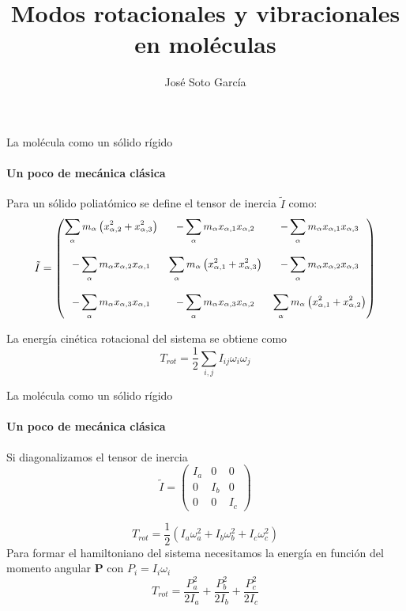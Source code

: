 \documentclass[a4paper]{beamer}
\title{Modos rotacionales y vibracionales en moléculas}
\author{José Soto García}
\begin{document}
\maketitle

\begin{frame}{La molécula como un sólido rígido}
\framesubtitle{Un poco de mecánica clásica}
  Para un sólido poliatómico se define el tensor de inercia $\tilde I$ como:
  \[\small{
\tilde{I}=\begin{pmatrix}
\displaystyle\sum_{\alpha}m_{\alpha}\left(x^2_{\alpha,2}+x^2_{\alpha,3}\right) & -\displaystyle\sum_{\alpha}m_{\alpha}x_{\alpha,1}x_{\alpha,2} & -\displaystyle\sum_{\alpha}m_{\alpha}x_{\alpha,1}x_{\alpha,3} \\\\
-\displaystyle\sum_{\alpha}m_{\alpha}x_{\alpha,2}x_{\alpha,1} & \displaystyle\sum_{\alpha}m_{\alpha}\left(x^2_{\alpha,1}+x^2_{\alpha,3}\right) &-\displaystyle\sum_{\alpha}m_{\alpha}x_{\alpha,2}x_{\alpha,3} \\\\
-\displaystyle\sum_{\alpha}m_{\alpha}x_{\alpha,3}x_{\alpha,1} & -\displaystyle\sum_{\alpha}m_{\alpha}x_{\alpha,3}x_{\alpha,2} & \displaystyle\sum_{\alpha}m_{\alpha}\left(x^2_{\alpha,1}+x^2_{\alpha,2}\right) \end{pmatrix}}
\]

La energía cinética rotacional del sistema se obtiene como
$$T_{rot}=\frac{1}{2}\sum_{i,j}I_{ij}\omega_i\omega_j$$

\end{frame}

\begin{frame}{La molécula como un sólido rígido}
\framesubtitle{Un poco de mecánica clásica}
Si diagonalizamos el tensor de inercia
$$\tilde I = \begin{pmatrix}
I_a & 0 & 0\\
0 & I_b & 0\\
0 & 0 & I_c
\end{pmatrix}$$

$$T_{rot}=\frac{1}{2}\left(I_a\omega^2_a + I_b\omega^2_b + I_c\omega^2_c\right)$$
 Para formar el hamiltoniano del sistema necesitamos la energía en función del momento angular $\boldsymbol P$ con $P_i=I_i\omega_i$ 
 $$T_{rot}=\frac{P_a^2}{2I_a}+\frac{P_b^2}{2I_b}+\frac{P_c^2}{2I_c}$$
\end{frame}
\end{document}
